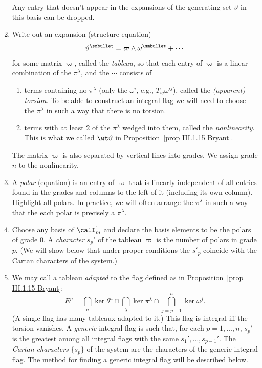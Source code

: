 \begin{enumerate}
\[    \]
    Any entry that doesn't appear in the expansions of the generating set $\vartheta$ in this basis can be dropped.
    \item Write out an expansion (structure equation) 
    \[\vartheta^{\smbullet}=\varpi\wedge\omega^{\smbullet}+\cdots\] 
    for some matrix $\varpi$, called the \emph{tableau}, so that each entry of $\varpi$ is a linear combination of the $\pi^\lambda$, and the $\cdots$ consists of 
    \begin{enumerate}
        \item terms containing no $\pi^\lambda$ (only the $\omega^i$, e.g., $T_{ij}\omega^{ij}$), called the \emph{(apparent) torsion}. To be able to construct an integral flag we will need to choose the $\pi^\lambda$ in such a way that there is no torsion.
        \item terms with at least $2$ of the $\pi^\lambda$ wedged into them, called the \emph{nonlinearity}. This is what we called $\wt\vartheta$ in Proposition~\ref{prop III.1.15 Bryant}.
    \end{enumerate}
    The matrix $\varpi$ is also separated by vertical lines into grades. We assign grade $n$ to the nonlinearity.
    \item A \emph{polar} (equation) is an entry of $\varpi$ that is linearly independent of all entries found in the grades and columns to the left of it (including its own column). Highlight all polars. In practice, we will often arrange the $\pi^\lambda$ in such a way that the each polar is precisely a $\pi^\lambda$.
    \item Choose any basis of $\calI^1_m$ and declare the basis elements to be the polars of grade $0$. A \emph{character} $s_p'$ of the tableau $\varpi$ is the number of polars in grade $p$. (We will show below that under proper conditions the $s'_p$ coincide with the Cartan characters of the system.)
    \item We may call a tableau \emph{adapted} to the flag defined as in Proposition~\ref{prop III.1.15 Bryant}:
    \[E^p=\bigcap_a \ker \theta^a\cap \bigcap_\lambda \ker \pi^{\lambda} \cap \bigcap_{j=p+1}^n\ker \omega^{j}.\]
    (A single flag has many tableaux adapted to it.) This flag is integral iff the torsion vanishes. A \emph{generic} integral flag is such that, for each $p=1,\ldots,n$, $s_p'$ is the greatest among all integral flags with the same $s_1',\ldots,s_{p-1}'$. The \emph{Cartan characters} $\{s_p\}$ of the system are the characters of the generic integral flag. The method for finding a generic integral flag will be described below.
 \end{enumerate}

